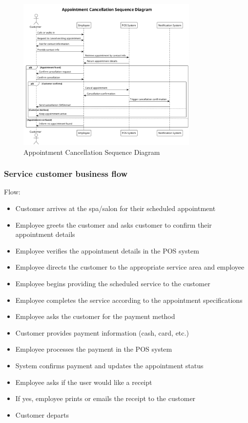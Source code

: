 \documentclass[]{VUMIFTemplateClass}
\begin{document}
\begin{figure}[H]
    \centering
    \includegraphics[width=0.8\textwidth]{images/diagrams/services/appointment_cancellation_sequence.png}
    \caption{Appointment Cancellation Sequence Diagram}
    \label{fig:appointment_cancellation_sequence}
\end{figure}

\subsubsection{Service customer business flow}

Flow:
\begin{itemize}
    \setlength{\itemsep}{2pt}
    \setlength{\parskip}{0pt}
    \setlength{\parsep}{0pt}
    \item Customer arrives at the spa/salon for their scheduled appointment
    \item Employee greets the customer and asks customer to confirm their appointment details
    \item Employee verifies the appointment details in the POS system
    \item Employee directs the customer to the appropriate service area and employee
    \item Employee begins providing the scheduled service to the customer
    \item Employee completes the service according to the appointment specifications
    \item Employee asks the customer for the payment method 
    \item Customer provides payment information (cash, card, etc.)
    \item Employee processes the payment in the POS system
    \item System confirms payment and updates the appointment status
    \item Employee asks if the user would like a receipt
    \item If yes, employee prints or emails the receipt to the customer
    \item Customer departs
\end{itemize}
\end{document}
